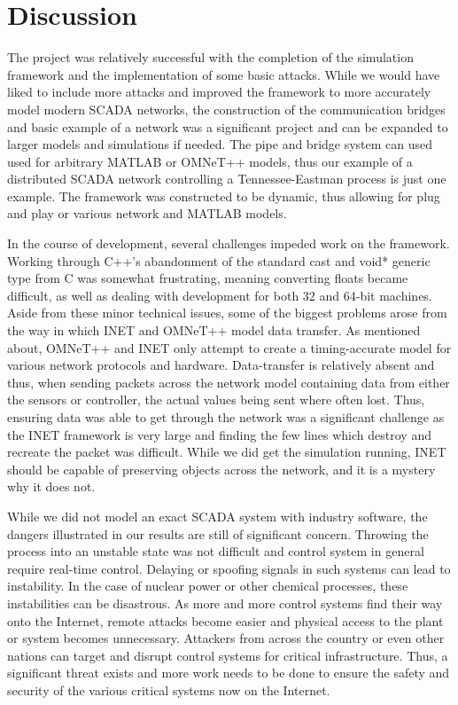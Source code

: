 \section{Discussion}

The project was relatively successful with the completion of the simulation framework and the implementation of some basic attacks. While we would have liked to include more attacks and improved the framework to more accurately model modern SCADA networks, the construction of the communication bridges and basic example of a network was a significant project and can be expanded to larger models and simulations if needed. The pipe and bridge system can used used for arbitrary MATLAB or OMNeT++ models, thus our example of a distributed SCADA network controlling a Tennessee-Eastman process is just one example. The framework was constructed to be dynamic, thus allowing for plug and play or various network and MATLAB models.

In the course of development, several challenges impeded work on the framework. Working through C++'s abandonment of the standard cast and void* generic type from C was somewhat frustrating, meaning converting floats became difficult, as well as dealing with development for both 32 and 64-bit machines. Aside from these minor technical issues, some of the biggest problems arose from the way in which INET and OMNeT++ model data transfer. As mentioned about, OMNeT++ and INET only attempt to create a timing-accurate model for various network protocols and hardware. Data-transfer is relatively absent and thus, when sending packets across the network model containing data from either the sensors or controller, the actual values being sent where often lost. Thus, ensuring data was able to get through the network was a significant challenge as the INET framework is very large and finding the few lines which destroy and recreate the packet was difficult. While we did get the simulation running, INET should be capable of preserving objects across the network, and it is a mystery why it does not.

While we did not model an exact SCADA system with industry software, the dangers illustrated in our results are still of significant concern. Throwing the process into an unstable state was not difficult and control system in general require real-time control. Delaying or spoofing signals in such systems can lead to instability. In the case of nuclear power or other chemical processes, these instabilities can be disastrous. As more and more control systems find their way onto the Internet, remote attacks become easier and physical access to the plant or system becomes unnecessary. Attackers from across the country or even other nations can target and disrupt control systems for critical infrastructure. Thus, a significant threat exists and more work needs to be done to ensure the safety and security of the various critical systems now on the Internet.

